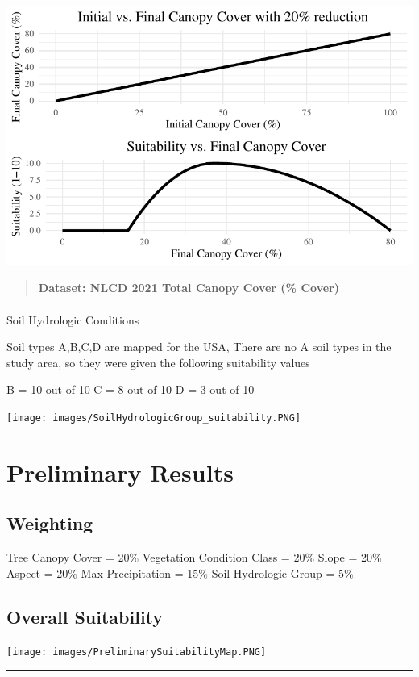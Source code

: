 \documentclass[
  number]{elsarticle}
\makeatletter
\let\oldparagraph\paragraph
\renewcommand{\paragraph}{
    \@ifstar
      \xxxParagraphStar
      \xxxParagraphNoStar
  }
\newcommand{\xxxParagraphStar}[1]{\oldparagraph*{#1}\mbox{}}
\newcommand{\xxxParagraphNoStar}[1]{\oldparagraph{#1}\mbox{}}
\makeatother
\begin{document}
\includegraphics{scraps_files/figure-pdf/unnamed-chunk-1-1.pdf}

\begin{quote}
\textbf{Dataset: NLCD 2021 Total Canopy Cover (\% Cover)}
\end{quote}

\paragraph{Soil Hydrologic Conditions}\label{soil-hydrologic-conditions}

Soil types A,B,C,D are mapped for the USA, There are no A soil types in
the study area, so they were given the following suitability values

B = 10 out of 10 C = 8 out of 10 D = 3 out of 10

\texttt{[image: images/SoilHydrologicGroup\_suitability.PNG]}

\section{Preliminary Results}\label{preliminary-results}

\subsection{Weighting}\label{weighting}

Tree Canopy Cover = 20\% Vegetation Condition Class = 20\% Slope = 20\%
Aspect = 20\% Max Precipitation = 15\% Soil Hydrologic Group = 5\%

\subsection{Overall Suitability}\label{overall-suitability}

\texttt{[image: images/PreliminarySuitabilityMap.PNG]}

\begin{center}\rule{0.5\linewidth}{0.5pt}\end{center}
\end{document}
